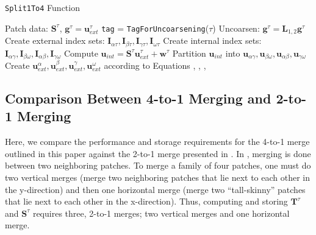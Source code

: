 \begin{algorithm}[H]
    \caption{\texttt{Split1To4} Function}
    \begin{algorithmic}[0]
        \Require Patch data: $\textbf{S}^{\tau}$, $\textbf{g}^{\tau} = \textbf{u}^{\tau}_{ext}$
        \State \texttt{tag} = \texttt{TagForUncoarsening}($\tau$) 
            \State Uncoarsen: $\textbf{g}^{\tau} = \textbf{L}_{1,2} \textbf{g}^{\tau}$ 
        \EndIf
        \State Create external index sets: $\textbf{I}_{\alpha \tau}, \textbf{I}_{\beta \tau}, \textbf{I}_{\gamma \tau}, \textbf{I}_{\omega \tau}$ 
        \State Create internal index sets: $\textbf{I}_{\alpha \gamma}, \textbf{I}_{\beta \omega}, \textbf{I}_{\alpha \beta}, \textbf{I}_{\gamma \omega}$ 
        \State Compute $\textbf{u}_{int} = \textbf{S}^{\tau} \textbf{u}^{\tau}_{ext} + \textbf{w}^{\tau}$ 
        \State Partition $\textbf{u}_{int}$ into $\textbf{u}_{\alpha \gamma}, \textbf{u}_{\beta \omega}, \textbf{u}_{\alpha \beta}, \textbf{u}_{\gamma \omega}$
        \State {}
        \State Create $\textbf{u}^{\alpha}_{ext}, \textbf{u}^{\beta}_{ext}, \textbf{u}^{\gamma}_{ext}, \textbf{u}^{\omega}_{ext}$ according to Equations , , , 
    \end{algorithmic}
    \label{alg:solve_split}
\end{algorithm}

\subsection{Comparison Between 4-to-1 Merging and 2-to-1 Merging}
\label{sub:comparison_between_4t1_and2t1_merging}

Here, we compare the performance and storage requirements for the 4-to-1 merge outlined in this paper against the 2-to-1 merge presented in \cite{gillman2014direct}. In \cite{gillman2014direct}, merging is done between two neighboring patches. To merge a family of four patches, one must do two vertical merges (merge two neighboring patches that lie next to each other in the y-direction) and then one horizontal merge (merge two ``tall-skinny'' patches that lie next to each other in the x-direction). Thus, computing and storing $\textbf{T}^{\tau}$ and $\textbf{S}^{\tau}$ requires three, 2-to-1 merges; two vertical merges and one horizontal merge.

